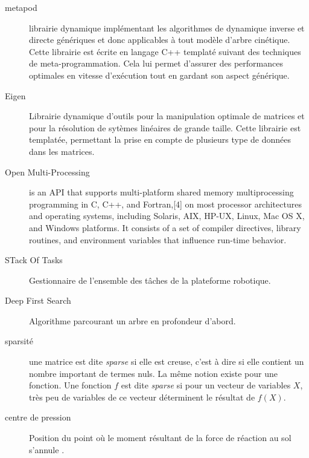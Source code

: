 \documentclass{report}
\begin{document}
\begin{description}
\item[metapod   ]{librairie dynamique implémentant les algorithmes de dynamique inverse et directe génériques et donc applicables à tout modèle d'arbre cinétique. Cette librairie est écrite en langage C++ templaté suivant des techniques de meta-programmation. Cela lui permet d'assurer des performances optimales en vitesse d'exécution tout en gardant son aspect générique.}
\item[Eigen   ]{Librairie dynamique d'outils pour la manipulation optimale de matrices et pour la résolution de sytèmes linéaires de grande taille. Cette librairie est templatée, permettant la prise en compte de plusieurs type de données dans les matrices.}
\item[Open Multi-Processing   ]{is an API that supports multi-platform shared memory multiprocessing programming in C, C++, and Fortran,[4] on most processor architectures and operating systems, including Solaris, AIX, HP-UX, Linux, Mac OS X, and Windows platforms. It consists of a set of compiler directives, library routines, and environment variables that influence run-time behavior.}
\item[STack Of Tasks   ]{Gestionnaire de l'ensemble des tâches de la plateforme robotique.}
\item[Deep First Search   ]{Algorithme parcourant un arbre en profondeur d'abord.}
\item[sparsité   ]{une matrice est dite \emph{sparse} si elle est creuse, c'est à dire si elle contient un nombre important de termes nuls. La même notion existe pour une fonction. Une fonction $f$ est dite \emph{sparse} si pour un vecteur de variables $X$, très peu de variables de ce vecteur déterminent le résultat de $f(X)$.}
\item[centre de pression   ]{Position du point où le moment résultant de la force de réaction au sol s'annule \cite{bib_commandeRobotsHumKajita}.}
\end{description}

\pagebreak





\appendix
{}




\clearpage
{}

\end{document}
